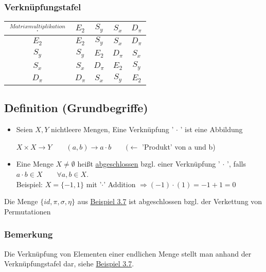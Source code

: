 \documentclass[12pt,titlepage, pdf]{article}
\newcommand{\uline}[1]{\underline{#1}}
\renewcommand{\>}{\rightarrow}
\renewcommand{\*}{\cdot}
\begin{document}
\\
\\
\subsubsection*{Verknüpfungstafel}
\begin{tabular}{c | c c c c}
	$\overset{Matrixmultiplikation}{\cdot} $ & $E_2$ & $S_y $ & $S_x$ & $D_\pi$ \\ \hline
	$E_2$ & $E_2$ & $S_y$ & $S_x$ & $D_ \pi$ \\
	$S_y$ & $S_y$ & $E_2$ & $D_\pi$ & $S_x$ \\
	$S_x$ & $S_x$ & $D_\pi$ & $E_2$ & $S_y$ \\
	$D_\pi$ & $D_\pi$ & $S_x$ & $S_y$ & $E_2$ \\
\end{tabular}
\subsection{Definition (Grundbegriffe)}
\begin{itemize}
	\item Seien $X,Y$ nichtleere Mengen, Eine Verknüpfung ' $\cdot$ ' ist eine Abbildung
	\begin{center}
		$X \times X \rightarrow Y\qquad (a,b) \rightarrow a \cdot b  \qquad( \leftarrow$ 'Produkt' von a und b)
	\end{center}
	\item Eine Menge $X \neq \emptyset$ heißt \uline{abgeschlossen} bzgl. einer Verknüpfung ' $\cdot$ ', falls $a \cdot b \in  X \qquad \forall a,b \in X$. \\
	Beispiel: $X=\{-1,1\}$ mit '$\*$' Addition $\Rightarrow(-1)\*(1)=-1+1=0$
\end{itemize}
	Die Menge $\{id, \pi ,\sigma, \eta \}$ aus \hyperref[3.7]{Beispiel 3.7} ist abgeschlossen bzgl. der Verkettung von Permutationen \\
	\subsubsection*{Bemerkung} Die Verknüpfung von Elementen einer endlichen Menge stellt man anhand der Verknüpfungstafel dar, siehe \hyperref[3.7]{Beispiel 3.7}.
\end{document}
